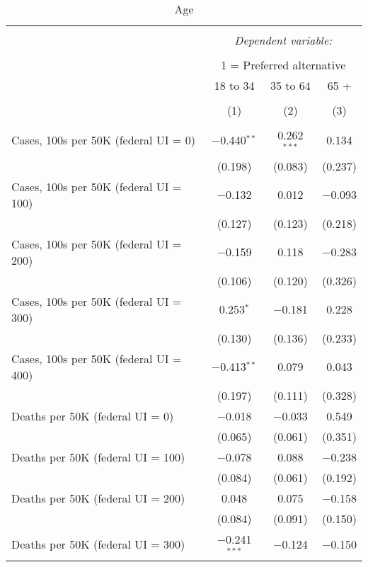 
\begin{table}[!htbp] \centering \scriptsize 
  \caption{Age} 
  \label{} 
\begin{tabular}{@{\extracolsep{5pt}}lccc} 
\\[-1.8ex]\hline 
\hline \\[-1.8ex] 
 & \multicolumn{3}{c}{\textit{Dependent variable:}} \\ 
\cline{2-4} 
\\[-1.8ex] & \multicolumn{3}{c}{1 = Preferred alternative} \\ 
 & 18 to 34 & 35 to 64 & 65 + \\ 
\\[-1.8ex] & (1) & (2) & (3)\\ 
\hline \\[-1.8ex] 
 Cases, 100s per 50K (federal UI = 0) & $-$0.440$^{**}$ & 0.262$^{***}$ & 0.134 \\ 
  & (0.198) & (0.083) & (0.237) \\ 
  Cases, 100s per 50K (federal UI = 100) & $-$0.132 & 0.012 & $-$0.093 \\ 
  & (0.127) & (0.123) & (0.218) \\ 
  Cases, 100s per 50K (federal UI = 200) & $-$0.159 & 0.118 & $-$0.283 \\ 
  & (0.106) & (0.120) & (0.326) \\ 
  Cases, 100s per 50K (federal UI = 300) & 0.253$^{*}$ & $-$0.181 & 0.228 \\ 
  & (0.130) & (0.136) & (0.233) \\ 
  Cases, 100s per 50K (federal UI = 400) & $-$0.413$^{**}$ & 0.079 & 0.043 \\ 
  & (0.197) & (0.111) & (0.328) \\ 
  Deaths per 50K (federal UI = 0) & $-$0.018 & $-$0.033 & 0.549 \\ 
  & (0.065) & (0.061) & (0.351) \\ 
  Deaths per 50K (federal UI = 100) & $-$0.078 & 0.088 & $-$0.238 \\ 
  & (0.084) & (0.061) & (0.192) \\ 
  Deaths per 50K (federal UI = 200) & 0.048 & 0.075 & $-$0.158 \\ 
  & (0.084) & (0.091) & (0.150) \\ 
  Deaths per 50K (federal UI = 300) & $-$0.241$^{***}$ & $-$0.124 & $-$0.150 \\ 

\end{tabular}
\end{table}
